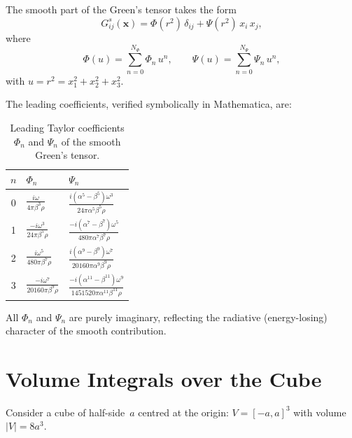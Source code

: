 \documentclass[11pt,a4paper]{article}
\newcommand{\bx}{\mathbf{x}}
\begin{document}
The smooth part of the Green's tensor takes the form
\begin{equation}
  G^s_{ij}(\bx) = \Phi(r^2)\,\delta_{ij}
    + \Psi(r^2)\,x_i\,x_j,
  \label{eq:Gsmooth}
\end{equation}
where
\begin{equation}
  \Phi(u) = \sum_{n=0}^{N_\Phi} \Phi_n\, u^n,
  \qquad
  \Psi(u) = \sum_{n=0}^{N_\Psi} \Psi_n\, u^n,
  \label{eq:PhiPsi}
\end{equation}
with $u = r^2 = x_1^2 + x_2^2 + x_3^2$.

The leading coefficients, verified symbolically in Mathematica,
are:

\begin{table}[ht]
\centering
\caption{Leading Taylor coefficients $\Phi_n$ and $\Psi_n$ of the
  smooth Green's tensor.}
\label{tab:coeffs}
\begin{tabular}{@{}cll@{}}
\toprule
$n$ & $\Phi_n$ & $\Psi_n$ \\
\midrule
0 & $\displaystyle\frac{i\omega}{4\pi\beta^3\rho}$
  & $\displaystyle\frac{i(\alpha^5 - \beta^5)\omega^3}
     {24\pi\alpha^5\beta^5\rho}$ \\[12pt]
1 & $\displaystyle\frac{-i\omega^3}{24\pi\beta^5\rho}$
  & $\displaystyle\frac{-i(\alpha^7 - \beta^7)\omega^5}
     {480\pi\alpha^7\beta^7\rho}$ \\[12pt]
2 & $\displaystyle\frac{i\omega^5}{480\pi\beta^7\rho}$
  & $\displaystyle\frac{i(\alpha^9 - \beta^9)\omega^7}
     {20160\pi\alpha^9\beta^9\rho}$ \\[12pt]
3 & $\displaystyle\frac{-i\omega^7}{20160\pi\beta^9\rho}$
  & $\displaystyle\frac{-i(\alpha^{11} - \beta^{11})\omega^9}
     {1451520\pi\alpha^{11}\beta^{11}\rho}$ \\
\bottomrule
\end{tabular}
\end{table}

\noindent
All $\Phi_n$ and $\Psi_n$ are purely imaginary, reflecting the
radiative (energy-losing) character of the smooth contribution.

\section{Volume Integrals over the Cube}
\label{sec:cube}

Consider a cube of half-side~$a$ centred at the origin:
$V = [-a,a]^3$ with volume $|V| = 8a^3$.
\end{document}
